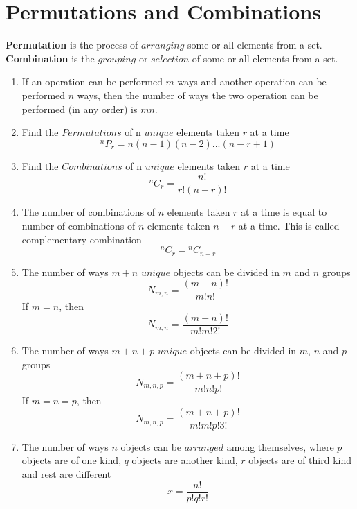 \documentclass[a4paper]{book}
\begin{document}
\section{Permutations and Combinations}
\textbf{Permutation} is the process of $arranging$ some or all elements from a set. \textbf{Combination} is the $grouping$ or $selection$ of some or all elements from a set. 
\begin{enumerate}
\item If an operation can be performed $m$ ways and another operation can be performed $n$ ways, then the number of ways the two operation can be performed (in any order) is $mn$.
\item Find the $Permutations$ of n $unique$ elements taken $r$ at a time
\begin{equation}
^{n}P_{r} = n(n - 1)(n - 2)...(n - r + 1)
\end{equation}
\item Find the $Combinations$ of n $unique$ elements taken $r$ at a time
\begin{equation}
^{n}C_{r} = \frac{n!}{r!(n - r)!}
\end{equation}
\item The number of combinations of $n$ elements taken $r$ at a time is equal to number of combinations of $n$ elements taken $n - r$ at a time. This is called complementary combination
\begin{equation}
^{n}C_{r} = {}^{n}C_{n - r}
\end{equation}
\item The number of ways $m + n$ $unique$ objects can be divided in $m$ and $n$ groups
\begin{equation}
N_{m,n} = \frac{(m + n)!}{m!n!}
\end{equation}
If $m = n$, then
\begin{equation}
N_{m,n} = \frac{(m + n)!}{m!m!2!}
\end{equation}
\item The number of ways $m + n + p$ $unique$ objects can be divided in $m$, $n$ and $p$ groups
\begin{equation}
N_{m,n,p} = \frac{(m + n + p)!}{m!n!p!}
\end{equation}
If $m = n = p$, then
\begin{equation}
N_{m,n,p} = \frac{(m + n + p)!}{m!m!p!3!}
\end{equation}
\item The number of ways $n$ objects can be $arranged$ among themselves, where $p$ objects are of one kind, $q$ objects are another kind, $r$ objects are of third kind and rest are different 
\begin{equation}
x = \frac{n!}{p!q!r!}
\end{equation}
\end{enumerate}
\end{document}
